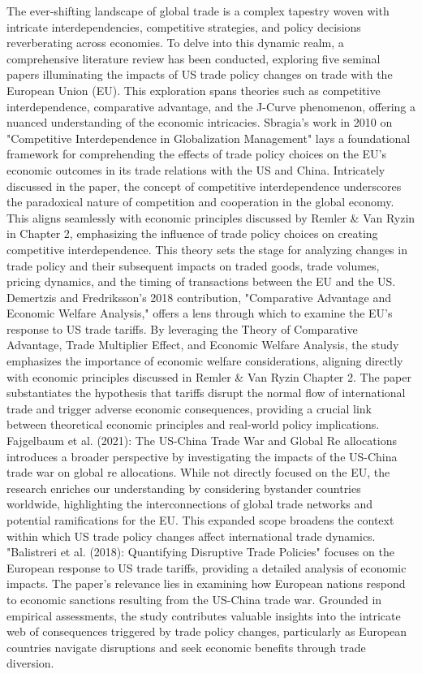 \documentclass[12pt]{article}
\begin{document}
The ever-shifting landscape of global trade is a complex tapestry woven with intricate interdependencies, competitive strategies, and policy decisions reverberating across economies. To delve into this dynamic realm, a comprehensive literature review has been conducted, exploring five seminal papers illuminating the impacts of US trade policy changes on trade with the European Union (EU). This exploration spans theories such as competitive interdependence, comparative advantage, and the J-Curve phenomenon, offering a nuanced understanding of the economic intricacies. Sbragia's work in 2010 on "Competitive Interdependence in Globalization Management" lays a foundational framework for comprehending the effects of trade policy choices on the EU's economic outcomes in its trade relations with the US and China. Intricately discussed in the paper, the concept of competitive interdependence underscores the paradoxical nature of competition and cooperation in the global economy. This aligns seamlessly with economic principles discussed by Remler \& Van Ryzin in Chapter 2, emphasizing the influence of trade policy choices on creating competitive interdependence. This theory sets the stage for analyzing changes in trade policy and their subsequent impacts on traded goods, trade volumes, pricing dynamics, and the timing of transactions between the EU and the US.
Demertzis and Fredriksson's 2018 contribution, "Comparative Advantage and Economic Welfare Analysis," offers a lens through which to examine the EU's response to US trade tariffs. By leveraging the Theory of Comparative Advantage, Trade Multiplier Effect, and Economic Welfare Analysis, the study emphasizes the importance of economic welfare considerations, aligning directly with economic principles discussed in Remler \& Van Ryzin Chapter 2. The paper substantiates the hypothesis that tariffs disrupt the normal flow of international trade and trigger adverse economic consequences, providing a crucial link between theoretical economic principles and real-world policy implications.
Fajgelbaum et al. (2021): The US-China Trade War and Global Re allocations introduces a broader perspective by investigating the impacts of the US-China trade war on global re allocations. While not directly focused on the EU, the research enriches our understanding by considering bystander countries worldwide, highlighting the interconnections of global trade networks and potential ramifications for the EU. This expanded scope broadens the context within which US trade policy changes affect international trade dynamics.
"Balistreri et al. (2018): Quantifying Disruptive Trade Policies" focuses on the European response to US trade tariffs, providing a detailed analysis of economic impacts. The paper's relevance lies in examining how European nations respond to economic sanctions resulting from the US-China trade war. Grounded in empirical assessments, the study contributes valuable insights into the intricate web of consequences triggered by trade policy changes, particularly as European countries navigate disruptions and seek economic benefits through trade diversion.
\end{document}
